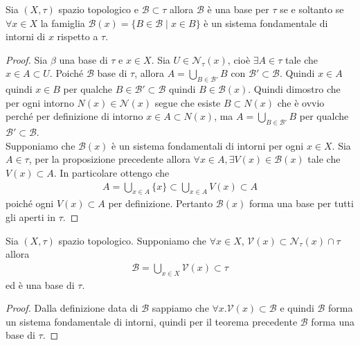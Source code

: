 \begin{theorem}
	Sia $(X,\tau)$ spazio topologico e $\mathcal{B} \subset \tau$ allora $\mathcal{B}$ è una base per $\tau$ se e soltanto se $\forall x \in X$ la famiglia $\mathcal{B}(x) = \{B \in \mathcal{B} \mid x \in B \}$ è un sistema fondamentale di intorni di $x$ rispetto a $\tau$.
\end{theorem}
\begin{proof}
	Sia $\beta$ una base di $\tau$ e $x \in X$. Sia $U \in \mathcal{N}_\tau(x)$, cioè $\exists A \in \tau$ tale che $x \in A \subset U$. Poiché $\mathcal{B}$ base di $\tau$, allora $A = \bigcup_{B \in \mathcal{B}'} B$ con $\mathcal{B}' \subset \mathcal{B}$. Quindi $x \in A$ quindi $x \in B$ per qualche $B \in \mathcal{B}' \subset \mathcal{B}$ quindi $B \in \mathcal{B}(x)$. Quindi dimostro che per ogni intorno $N(x) \in \mathcal{N}(x)$ segue che esiste $B \subset N(x)$ che è ovvio perché per definizione di intorno $x \in A \subset N(x)$, ma $A = \bigcup_{B \in \mathcal{B}'} B$ per qualche $\mathcal{B}' \subset \mathcal{B}$.\\  
	
	Supponiamo che $\mathcal{B}(x)$ è un sistema fondamentali di intorni per ogni $x \in X$. Sia $A \in \tau$, per la proposizione precedente allora $\forall x \in A, \exists V(x) \in \mathcal{B}(x)$ tale che $V(x) \subset A$. In particolare ottengo che
	\begin{equation}
	\begin{aligned}
		A = \bigcup_{x \in A} \{x\} \subset \bigcup_{x \in A} V(x) \subset A
	\end{aligned}
	\end{equation} 
	poiché ogni $V(x) \subset A$ per definizione. Pertanto $\mathcal{B}(x)$ forma una base per tutti gli aperti in $\tau$.
\end{proof}

\begin{corollary}
	\label{crl:base_from_sfi}
	Sia $(X,\tau)$ spazio topologico. Supponiamo che $\forall x \in X$, $\mathcal{V}(x) \subset \mathcal{N}_\tau(x) \cap \tau$ allora 
	\begin{equation}
	\begin{aligned}
		\mathcal{B} = \bigcup_{x \in X} \mathcal{V}(x) \subset \tau
	\end{aligned}
	\end{equation}
	ed è una base di $\tau$.
\end{corollary}
\begin{proof}
	Dalla definizione data di $\mathcal{B}$ sappiamo che $\forall x . \mathcal{V}(x) \subset \mathcal{B}$ e quindi $\mathcal{B}$ forma un sistema fondamentale di intorni, quindi per il teorema precedente $\mathcal{B}$ forma una base di $\tau$.
\end{proof}

